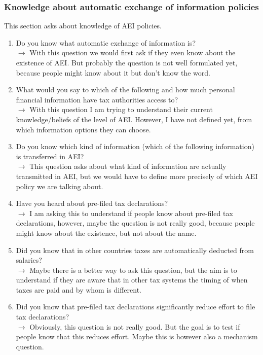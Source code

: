 \documentclass[12pt]{article}
\begin{document}
\subsubsection{Knowledge about automatic exchange of information policies}
This section asks about knowledge of AEI policies. 
\begin{enumerate}
    \item Do you know what automatic exchange of information is? \\ $\rightarrow$ 
    With this question we would first ask if they even know about the existence of AEI. But probably the question is not well formulated yet, because people might know about it but don't know the word. 
    \item What would you say to which of the following and how much personal financial information have tax authorities access to? \\$\rightarrow$ With this question I am trying to understand their current knowledge/beliefs of the level of AEI. However, I have not defined yet, from which information options they can choose. 
    \item Do you know which kind of information (which of the following information) is transferred in AEI? \\$\rightarrow$ This question asks about what kind of information are actually transmitted in AEI, but we would have to define more precisely of which AEI policy we are talking about. 
    \item Have you heard about pre-filed tax declarations? \\ $\rightarrow$ I am asking this to understand if people know about pre-filed tax declarations, however, maybe the question is not really good, because people might know about the existence, but not about the name. 
    \item Did you know that in other countries taxes are automatically deducted from salaries? \\ $\rightarrow$ Maybe there is a better way to ask this question, but the aim is to understand if they are aware that in other tax systems the timing of when taxes are paid and by whom is different.
    \item Did you know that pre-filed tax declarations significantly reduce effort to file tax declarations? \\$\rightarrow$ Obviously, this question is not really good. But the goal is to test if people know that this reduces effort. Maybe this is however also a mechanism question. 
\end{enumerate}
\end{document}

